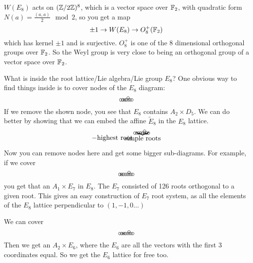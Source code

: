  $W(E_8)$ acts on $(\mathbb{Z}/2\mathbb{Z})^8$, which is a vector space over $\mathbb{F}_2$, with quadratic
 form $N(a)=\frac{(a,a)}{2} \mod 2$, so you get a map
 \[
    \pm 1\to W(E_8) \to O^+_8(\mathbb{F}_2)
 \]
 which has kernel $\pm 1$ and is surjective. $O^+_8$ is one of the $8$ dimensional
 orthogonal groups over $\mathbb{F}_2$. So the Weyl group is very close to being an
 orthogonal group of a vector space over $\mathbb{F}_2$.

 What is inside the root lattice/Lie algebra/Lie group $E_8$? One obvious way to find
 things inside is to cover nodes of the $E_8$ diagram:
 \[\begin{xy}
   (0,0) *\cir<2pt>{};
   p+(1,0) *\cir<2pt>{} **@{-};
   p+(1,0) *{\times} *\cir<2pt>{} **@{-};
   p+(1,0) *\cir<2pt>{} **@{-};
   p+(1,0) *\cir<2pt>{} **@{-};
   p+(0,1) *\cir<2pt>{} **@{-},
   p+(1,0) *\cir<2pt>{} **@{-};
   p+(1,0) *\cir<2pt>{} **@{-};
 \end{xy} \]
 If we remove the shown node, you see that $E_8$ contains $A_2\times D_5$. We can do
 better by showing that we can embed the affine $\tilde E_8$ in the $E_8$ lattice.
 \[\begin{xy}
   (0,0) *+!UR{-\text{highest root}} *\cir<2pt>{};
   p+(1,0) *\cir<2pt>{} **@{-};
   p+(1,0) *\cir<2pt>{} **@{-};
   p+(1,0) *\cir<2pt>{} **@{-};
   p+(1,0) *\cir<2pt>{} **@{-};
   p+(1,0) *\cir<2pt>{} **@{-};
   p+(0,1) *\cir<2pt>{} **@{-},
   p+(1,0) *\cir<2pt>{} **@{-};
   p+(1,0) *\cir<2pt>{} **@{-};
   (4,-.3) *=(6.3,0)\frm{_\}} *+!U{\text{simple roots}}
 \end{xy} \]
 Now you can remove nodes here and get some bigger sub-diagrams. For example, if we
 cover
 \[\begin{xy}
   (0,0) *\cir<2pt>{};
   p+(1,0) *{\times} *\cir<2pt>{} **@{-};
   p+(1,0) *\cir<2pt>{} **@{-};
   p+(1,0) *\cir<2pt>{} **@{-};
   p+(1,0) *\cir<2pt>{} **@{-};
   p+(1,0) *\cir<2pt>{} **@{-};
   p+(0,1) *\cir<2pt>{} **@{-},
   p+(1,0) *\cir<2pt>{} **@{-};
   p+(1,0) *\cir<2pt>{} **@{-};
 \end{xy} \]
 you get that an $A_1\times E_7$ in $E_8$. The $E_7$ consisted of 126
 roots orthogonal to a given root. This gives an easy construction of $E_7$ root
 system, as all the elements of the $E_8$ lattice perpendicular to $(1,-1,0\dots)$

 We can cover
 \[\begin{xy}
   (0,0) *\cir<2pt>{};
   p+(1,0) *\cir<2pt>{} **@{-};
   p+(1,0) *{\times} *\cir<2pt>{} **@{-};
   p+(1,0) *\cir<2pt>{} **@{-};
   p+(1,0) *\cir<2pt>{} **@{-};
   p+(1,0) *\cir<2pt>{} **@{-};
   p+(0,1) *\cir<2pt>{} **@{-},
   p+(1,0) *\cir<2pt>{} **@{-};
   p+(1,0) *\cir<2pt>{} **@{-};
 \end{xy} \]
 Then we get an $A_2\times E_6$, where the $E_6$ are all the vectors with the first 3
 coordinates equal. So we get the $E_6$ lattice for free too.

